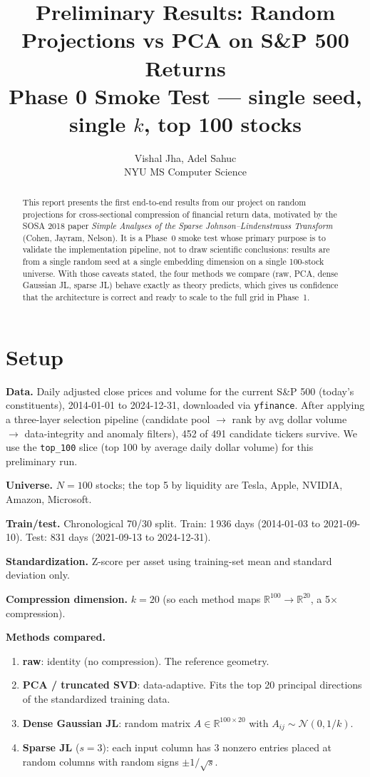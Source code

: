 \documentclass[11pt]{article}
\title{\textbf{Preliminary Results: Random Projections vs PCA on S\&P 500 Returns}\\[2pt]\large{Phase 0 Smoke Test --- single seed, single $k$, top 100 stocks}}
\author{Vishal Jha, Adel Sahuc \\ NYU MS Computer Science}
\date{}
\begin{document}
\maketitle

\vspace{-1.0em}

\begin{abstract}
This report presents the first end-to-end results from our project on random projections for cross-sectional compression of financial return data, motivated by the SOSA 2018 paper \emph{Simple Analyses of the Sparse Johnson--Lindenstrauss Transform} (Cohen, Jayram, Nelson). It is a Phase~0 smoke test whose primary purpose is to validate the implementation pipeline, not to draw scientific conclusions: results are from a single random seed at a single embedding dimension on a single 100-stock universe. With those caveats stated, the four methods we compare (raw, PCA, dense Gaussian JL, sparse JL) behave exactly as theory predicts, which gives us confidence that the architecture is correct and ready to scale to the full grid in Phase~1.
\end{abstract}

\section{Setup}

\textbf{Data.} Daily adjusted close prices and volume for the current S\&P 500 (today's constituents), 2014-01-01 to 2024-12-31, downloaded via \texttt{yfinance}. After applying a three-layer selection pipeline (candidate pool $\to$ rank by avg dollar volume $\to$ data-integrity and anomaly filters), 452 of 491 candidate tickers survive. We use the \texttt{top\_100} slice (top 100 by average daily dollar volume) for this preliminary run.

\textbf{Universe.} $N = 100$ stocks; the top 5 by liquidity are Tesla, Apple, NVIDIA, Amazon, Microsoft.

\textbf{Train/test.} Chronological 70/30 split. Train: 1\,936 days (2014-01-03 to 2021-09-10). Test: 831 days (2021-09-13 to 2024-12-31).

\textbf{Standardization.} Z-score per asset using training-set mean and standard deviation only.

\textbf{Compression dimension.} $k = 20$ (so each method maps $\mathbb{R}^{100} \to \mathbb{R}^{20}$, a 5$\times$ compression).

\textbf{Methods compared.}
\begin{enumerate}
    \item \textbf{raw}: identity (no compression). The reference geometry.
    \item \textbf{PCA / truncated SVD}: data-adaptive. Fits the top 20 principal directions of the standardized training data.
    \item \textbf{Dense Gaussian JL}: random matrix $A \in \mathbb{R}^{100 \times 20}$ with $A_{ij} \sim \mathcal{N}(0, 1/k)$.
    \item \textbf{Sparse JL} ($s = 3$): each input column has 3 nonzero entries placed at random columns with random signs $\pm 1/\sqrt{s}$.
\end{enumerate}
\end{document}
